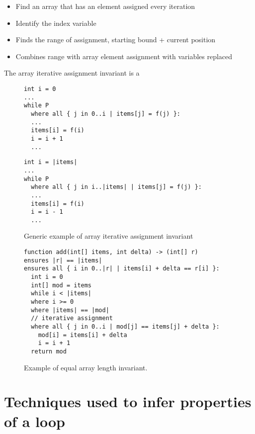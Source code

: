 \begin{itemize}
	\item Find an array that has an element assigned every iteration
	\item Identify the index variable
	\item Finds the range of assignment, starting bound + current position
	\item Combines range with array element assignment with variables replaced
\end{itemize}

The array iterative assignment invariant is a 

\begin{figure}[ht]
\noindent
\begin{minipage}{.45\textwidth}
\begin{lstlisting}
int i = 0
...
while P
  where all { j in 0..i | items[j] = f(j) }:
  ...
  items[i] = f(i)
  i = i + 1
  ...
\end{lstlisting}
\end{minipage}\hfill
\begin{minipage}{.45\textwidth}
\begin{lstlisting}
int i = |items|
...
while P
  where all { j in i..|items| | items[j] = f(j) }:
  ...
  items[i] = f(i)
  i = i - 1
  ...
\end{lstlisting}
\end{minipage}
\caption{Generic example of array iterative assignment invariant}
\label{lst:array-iter-gen}
\end{figure}



\begin{figure}[ht]
\begin{lstlisting}
function add(int[] items, int delta) -> (int[] r)
ensures |r| == |items|
ensures all { i in 0..|r| | items[i] + delta == r[i] }:
  int i = 0
  int[] mod = items
  while i < |items|
  where i >= 0
  where |items| == |mod|
  // iterative assignment
  where all { j in 0..i | mod[j] == items[j] + delta }:
    mod[i] = items[i] + delta
    i = i + 1
  return mod
\end{lstlisting}
\caption{Example of equal array length invariant.}
\label{lst:equal-array-len}
\end{figure}

\section{Techniques used to infer properties of a loop}


